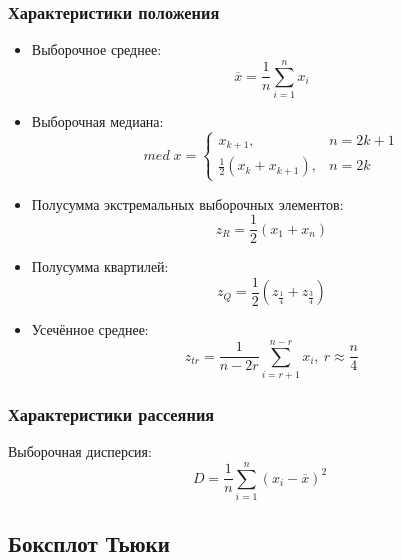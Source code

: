 \documentclass[12pt,a4paper]{article}
\begin{document}
		\subsubsection{Характеристики положения}
			\begin{itemize}
				\item Выборочное среднее:
				\begin{equation}\label{eqn:average}
				\overline{x} = \frac{1}{n}\sum_{i=1}^n x_i
				\end{equation}
				
				\item Выборочная медиана:
				\begin{equation}\label{eqn:med}
				med\;x =
				\begin{cases}
				x_{k+1}, & n = 2k+1\\
				\frac{1}{2}\left(x_k+x_{k+1}\right), & n = 2k
				\end{cases}
				\end{equation}
				
				\item Полусумма экстремальных выборочных элементов:
				\begin{equation}\label{eqn:mean_extr}
				z_R = \frac{1}{2}\left(x_1+x_n\right)
				\end{equation}
				
				\item Полусумма квартилей:
				\begin{equation}\label{eqn:quartiles}
				z_Q = \frac{1}{2}\left(z_{\frac{1}{4}}+z_{\frac{3}{4}}\right) 
				\end{equation}
				
				\item Усечённое среднее:
				\begin{equation}\label{eqn:trim_mean}
				z_{tr} = \frac{1}{n - 2r}\sum_{i=r+1}^{n-r} x_i,\ r\approx\frac{n}{4}
				\end{equation}
			\end{itemize}
		
			\subsubsection{Характеристики рассеяния}
				Выборочная дисперсия:
				\begin{equation}\label{eqn:var}
				D = \frac{1}{n}\sum_{i=1}^n (x_i-\overline{x})^2
				\end{equation}
	\subsection{Боксплот Тьюки}
\end{document}
